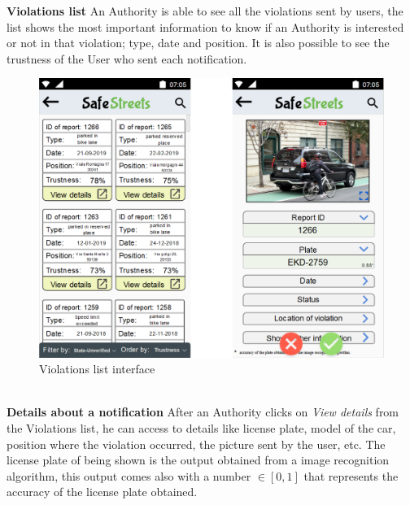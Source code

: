     \noindent\textbf{Violations list}\newline
    An Authority is able to see all the violations sent by users, the list shows the most important information to know if an Authority is interested or not in that violation; type, date and position. It is also possible to see the trustness of the User who sent each notification.\newline
            \begin{figure}[h]
        \centering
        \includegraphics[scale=0.58]{Images/violations_and_details.png}
        \caption{Violations list interface}
    \end{figure}
    \newline\\
    \textbf{Details about a notification}\newline
    After an Authority clicks on \textit{View details} from the Violations list, he can access to details like license plate, model of the car, position where the violation occurred, the picture sent by the user, etc. The license plate of being shown is the output obtained from a image recognition algorithm, this output comes also with a number $\in [0,1]$ that represents the accuracy of the license plate obtained.
